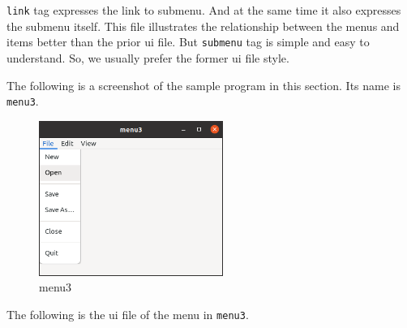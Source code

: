 \passthrough{\lstinline!link!} tag expresses the link to submenu. And at
the same time it also expresses the submenu itself. This file
illustrates the relationship between the menus and items better than the
prior ui file. But \passthrough{\lstinline!submenu!} tag is simple and
easy to understand. So, we usually prefer the former ui file style.

The following is a screenshot of the sample program in this section. Its
name is \passthrough{\lstinline!menu3!}.

\begin{figure}
\centering
\includegraphics[width=6cm,height=5.055cm]{../image/menu3.png}
\caption{menu3}
\end{figure}

The following is the ui file of the menu in
\passthrough{\lstinline!menu3!}.

